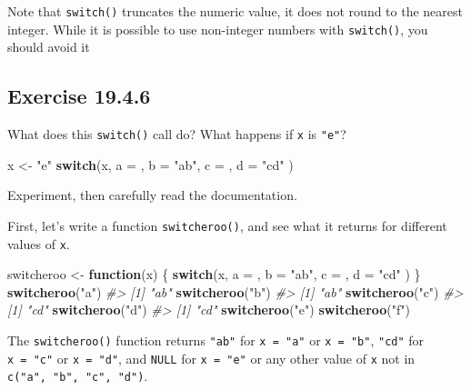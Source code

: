 \documentclass[]{book}
\newenvironment{Shaded}{\begin{snugshade}}{\end{snugshade}}
\newcommand{\CommentTok}[1]{\textcolor[rgb]{0.56,0.35,0.01}{\textit{#1}}}
\newcommand{\ControlFlowTok}[1]{\textcolor[rgb]{0.13,0.29,0.53}{\textbf{#1}}}
\newcommand{\DataTypeTok}[1]{\textcolor[rgb]{0.13,0.29,0.53}{#1}}
\newcommand{\KeywordTok}[1]{\textcolor[rgb]{0.13,0.29,0.53}{\textbf{#1}}}
\newcommand{\NormalTok}[1]{#1}
\newcommand{\StringTok}[1]{\textcolor[rgb]{0.31,0.60,0.02}{#1}}
\theoremstyle{plain}
\theoremstyle{remark}
\theoremstyle{definition}
\theoremstyle{definition}
\theoremstyle{definition}
\theoremstyle{remark}
\begin{document}
Note that \texttt{switch()} truncates the numeric value, it does not
round to the nearest integer. While it is possible to use non-integer
numbers with \texttt{switch()}, you should avoid it

\hypertarget{exercise-19.4.6}{%
\subsection*{\texorpdfstring{Exercise
{19.4.6}}{Exercise 19.4.6}}\label{exercise-19.4.6}}

What does this \texttt{switch()} call do? What happens if \texttt{x} is
\texttt{"e"}?

\begin{Shaded}
\begin{Highlighting}[]
\NormalTok{x <-}\StringTok{ "e"}
\ControlFlowTok{switch}\NormalTok{(x,}
  \DataTypeTok{a =}\NormalTok{ ,}
  \DataTypeTok{b =} \StringTok{"ab"}\NormalTok{,}
  \DataTypeTok{c =}\NormalTok{ ,}
  \DataTypeTok{d =} \StringTok{"cd"}
\NormalTok{)}
\end{Highlighting}
\end{Shaded}

Experiment, then carefully read the documentation.

First, let's write a function \texttt{switcheroo()}, and see what it
returns for different values of \texttt{x}.

\begin{Shaded}
\begin{Highlighting}[]
\NormalTok{switcheroo <-}\StringTok{ }\ControlFlowTok{function}\NormalTok{(x) \{}
  \ControlFlowTok{switch}\NormalTok{(x,}
    \DataTypeTok{a =}\NormalTok{ ,}
    \DataTypeTok{b =} \StringTok{"ab"}\NormalTok{,}
    \DataTypeTok{c =}\NormalTok{ ,}
    \DataTypeTok{d =} \StringTok{"cd"}
\NormalTok{  )}
\NormalTok{\}}
\KeywordTok{switcheroo}\NormalTok{(}\StringTok{"a"}\NormalTok{)}
\CommentTok{#> [1] "ab"}
\KeywordTok{switcheroo}\NormalTok{(}\StringTok{"b"}\NormalTok{)}
\CommentTok{#> [1] "ab"}
\KeywordTok{switcheroo}\NormalTok{(}\StringTok{"c"}\NormalTok{)}
\CommentTok{#> [1] "cd"}
\KeywordTok{switcheroo}\NormalTok{(}\StringTok{"d"}\NormalTok{)}
\CommentTok{#> [1] "cd"}
\KeywordTok{switcheroo}\NormalTok{(}\StringTok{"e"}\NormalTok{)}
\KeywordTok{switcheroo}\NormalTok{(}\StringTok{"f"}\NormalTok{)}
\end{Highlighting}
\end{Shaded}

The \texttt{switcheroo()} function returns \texttt{"ab"} for
\texttt{x\ =\ "a"} or \texttt{x\ =\ "b"}, \texttt{"cd"} for
\texttt{x\ =\ "c"} or \texttt{x\ =\ "d"}, and \texttt{NULL} for
\texttt{x\ =\ "e"} or any other value of \texttt{x} not in
\texttt{c("a",\ "b",\ "c",\ "d")}.
\end{document}
